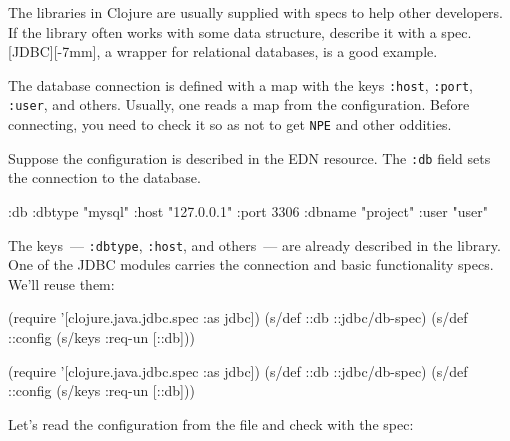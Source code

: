 
The libraries in Clojure are usually supplied with specs to help other developers. If the library often works with some data structure, describe it with a spec. [JDBC][-7mm], a wrapper for relational databases, is a good example.

The database connection is defined with a map with the keys \verb|:host|, \verb|:port|, \verb|:user|, and others. Usually, one reads a map from the configuration. Before connecting, you need to check it so as not to get \verb|NPE| and other oddities.


Suppose the configuration is described in the EDN resource. The \verb|:db| field sets the connection to the database.


\begin{english}
  \begin{clojure}
{:db {:dbtype "mysql"
      :host "127.0.0.1"
      :port 3306
      :dbname "project"
      :user "user"}}
  \end{clojure}
\end{english}

The keys~--- \verb|:dbtype|, \verb|:host|, and others~--- are already described in the library. One of the JDBC modules carries the connection and basic functionality specs. We'll reuse them:

\ifx\DEVICETYPE\MOBILE

\begin{english}
  \begin{clojure}
(require
  '[clojure.java.jdbc.spec :as jdbc])
(s/def ::db ::jdbc/db-spec)
(s/def ::config (s/keys :req-un [::db]))
  \end{clojure}
\end{english}

\else

\begin{english}
  \begin{clojure}
(require '[clojure.java.jdbc.spec :as jdbc])
(s/def ::db ::jdbc/db-spec)
(s/def ::config (s/keys :req-un [::db]))
  \end{clojure}
\end{english}

\fi

\noindent
Let's read the configuration from the file and check with the spec:

